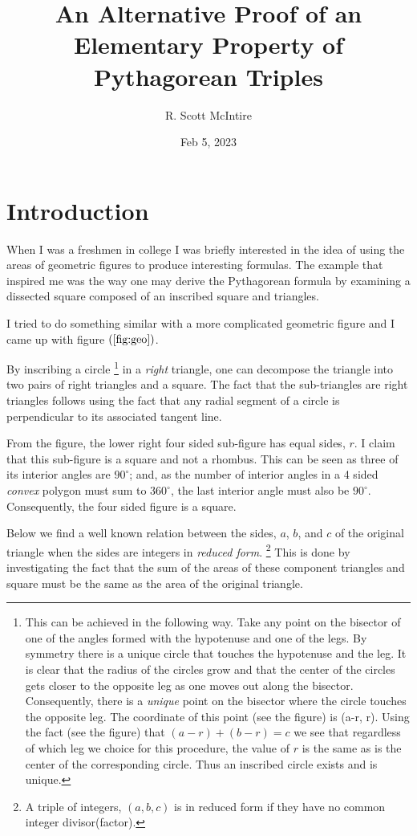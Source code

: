 \documentclass[12pt]{article}
\title{An Alternative Proof of an Elementary Property of Pythagorean Triples}
\author{R. Scott McIntire}
\date{Feb 5, 2023}
\begin{document}
\maketitle

\section{Introduction}
When I was a freshmen in college I was briefly interested in the idea of 
using the areas of geometric figures to
produce interesting formulas. The example that inspired me was the way one 
may derive the Pythagorean formula
by examining a dissected square composed of 
an inscribed square and triangles. 

I tried to do something similar with a more complicated geometric figure and 
I came up with figure $(\ref{fig:geo})$.

By inscribing a circle%
\footnote{This can be achieved in the following way.
Take any point on the bisector of one of the angles formed
with the hypotenuse and one of the legs. By symmetry there is a unique circle
that touches the hypotenuse and the leg. It is clear that the radius 
of the circles grow and that the center of the circles gets closer to the
opposite leg as one moves out along the bisector.
Consequently, there is
a {\em unique\/} point on the bisector where the circle touches the opposite leg.
The coordinate of this point (see the figure) is (a-r, r). Using the fact 
(see the figure) that $(a-r) + (b-r) = c$ we see that regardless of 
which leg we choice for this procedure, the value of $r$ is the same as is
the center of the corresponding circle. Thus an inscribed circle exists
and is unique.}
in a {\em right\/} triangle, one can decompose the triangle 
into two pairs of right triangles and a square. The fact that the sub-triangles
are right triangles follows using the fact that 
any radial segment of a circle is perpendicular to its
associated tangent line. 

From the figure, the lower right four sided sub-figure has equal sides, $r$.
I claim that this sub-figure is a square and not a rhombus.
This can be seen as three of its interior angles are 
$90^\circ$; and, as the number of interior angles in a 4 sided {\em convex\/} 
polygon must sum to $360^\circ$, the last interior angle must also be $90^\circ$.
Consequently, the four sided figure is a square.

Below we find a well known relation between the sides, $a$, $b$, and $c$ of the
original triangle when the sides are integers in {\em reduced form\/}.%
\footnote{A triple of integers, $(a, b, c)$ is in reduced form if 
they have no common integer divisor(factor).}
This is done by investigating the fact that the sum of the areas
of these component triangles 
and square must be the same as the area of the original triangle. 
\end{document}
